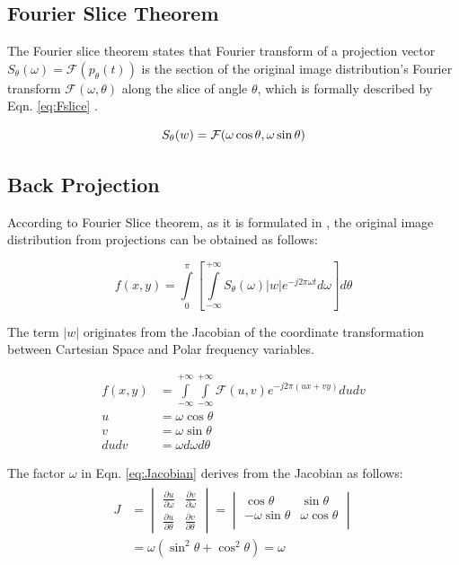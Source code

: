 \documentclass[journal]{IEEEtran}
\begin{document}
\subsection{Fourier Slice Theorem}

The Fourier slice theorem states that Fourier transform of a projection vector $S_{\theta}(\omega) = \mathcal{F}(p_{\theta}(t))$ is the section of the original image distribution's Fourier transform $\mathcal{F}(\omega,\theta)$ along the slice of angle $\theta$, which is formally described by Eqn. \ref{eq:Fslice} \cite{kak2001principles}.

\begin{equation}
	S_{\theta}(w) = \cal{F}(\omega\cos\theta,\omega\sin\theta)
	\label{eq:Fslice}
\end{equation}

\subsection{Back Projection}

According to Fourier Slice theorem, as it is formulated in \cite{kak2001principles}, the original image distribution from projections can be obtained as follows:

\begin{equation}
	f(x,y) = \int\limits_0^\pi\left[\int\limits_{-\infty}^{+\infty}S_{\theta}(\omega)|w|e^{-j2\pi{\omega}t}d\omega\right]d\theta
	\label{eq:perfectreconstruction}
\end{equation}

The term $|w|$ originates from the Jacobian of the coordinate transformation between Cartesian Space and Polar frequency variables. 

\begin{align}
	f(x,y) &= \int\limits_{-\infty}^{+\infty}\int\limits_{-\infty}^{+\infty}\mathcal{F}(u,v)e^{-j2\pi{(ux+vy)}}du{dv} \label{eq:2DFFT} \\
	u &= \omega\cos\theta \\
	v &= \omega\sin\theta \\
	du dv &= \omega d\omega d\theta \label{eq:Jacobian}
\end{align}

The factor $\omega$ in Eqn. \ref{eq:Jacobian} derives from the Jacobian as follows:
\begin{gather}
	\begin{align}
	J &= \begin{vmatrix}
		\frac{\partial u}{\partial \omega} & \frac{\partial v}{\partial \omega} \\ 
		\frac{\partial u}{\partial \theta} & \frac{\partial v}{\partial \theta} 
	\end{vmatrix} = \begin{vmatrix}
		\cos\theta & \sin\theta \\ 
		-\omega\sin\theta & \omega\cos\theta \\
	\end{vmatrix} \\
	&= \omega(\sin^2\theta + \cos^2\theta) = \omega
	\end{align}
\end{gather}
\end{document}
